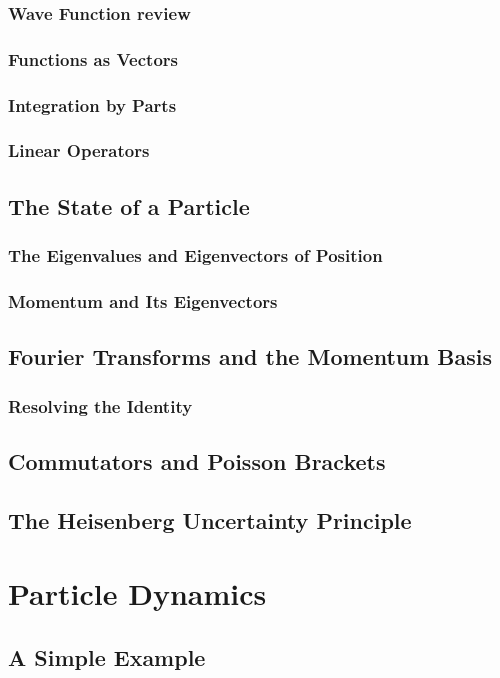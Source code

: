\documentclass[a4paper]{article}
\begin{document}
\subsubsection{Wave Function review}
\subsubsection{Functions as Vectors}
\subsubsection{Integration by Parts}
\subsubsection{Linear Operators}

\subsection{The State of a Particle}
\subsubsection{The Eigenvalues and Eigenvectors of Position}
\subsubsection{Momentum and Its Eigenvectors}
\subsection{Fourier Transforms and the Momentum Basis}
\subsubsection{Resolving the Identity}
\subsection{Commutators and Poisson Brackets}
\subsection{The Heisenberg Uncertainty Principle}
\section{Particle Dynamics}
\subsection{A Simple Example}
\end{document}
